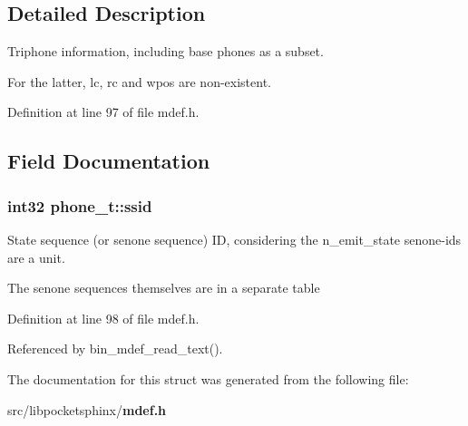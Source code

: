 \subsection{Detailed Description}
Triphone information, including base phones as a subset. 

For the latter, lc, rc and wpos are non-\/existent. 

Definition at line 97 of file mdef.\+h.



\subsection{Field Documentation}
\subsubsection[{ssid}]{\setlength{\rightskip}{0pt plus 5cm}int32 phone\+\_\+t\+::ssid}\label{structphone__t_af2f31836358c1c29c38a361b3923b859}


State sequence (or senone sequence) I\+D, considering the n\+\_\+emit\+\_\+state senone-\/ids are a unit. 

The senone sequences themselves are in a separate table 

Definition at line 98 of file mdef.\+h.



Referenced by bin\+\_\+mdef\+\_\+read\+\_\+text().



The documentation for this struct was generated from the following file\+:\begin{DoxyCompactItemize}
\item 
src/libpocketsphinx/{\bf mdef.\+h}\end{DoxyCompactItemize}
